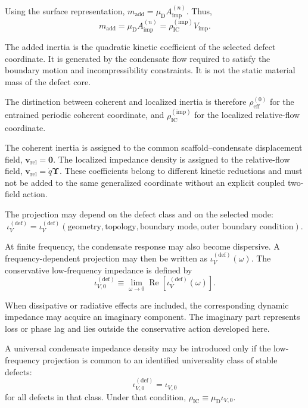 Using the surface representation, $m_{\mathrm{add}} = \mu_{\mathrm{D}} A_{\mathrm{imp}}^{(n)}$. Thus,
\begin{equation}
    m_{\mathrm{add}} = \mu_{\mathrm{D}} A_{\mathrm{imp}}^{(n)} = \rho_{\mathrm{IC}}^{(\mathrm{imp})} V_{\mathrm{imp}}.
\end{equation}

The added inertia is the quadratic kinetic coefficient of the selected defect coordinate. It is generated by the condensate flow required to satisfy the boundary motion and incompressibility constraints. It is not the static material mass of the defect core.

The distinction between coherent and localized inertia is therefore $\rho_{\mathrm{eff}}^{(0)}$ for the entrained periodic coherent coordinate, and $\rho_{\mathrm{IC}}^{(\mathrm{imp})}$ for the localized relative-flow coordinate.

The coherent inertia is assigned to the common scaffold--condensate displacement field, $\mathbf{v}_{\mathrm{rel}}=\mathbf{0}$. The localized impedance density is assigned to the relative-flow field, $\mathbf{v}_{\mathrm{rel}} = \dot{q}\boldsymbol{\Upsilon}$. These coefficients belong to different kinetic reductions and must not be added to the same generalized coordinate without an explicit coupled two-field action.

The projection may depend on the defect class and on the selected mode:
\begin{equation}
    \iota_V^{(\mathrm{def})} = \iota_V^{(\mathrm{def})} \left( \text{geometry}, \text{topology}, \text{boundary mode}, \text{outer boundary condition} \right).
\end{equation}

At finite frequency, the condensate response may also become dispersive. A frequency-dependent projection may then be written as $\iota_V^{(\mathrm{def})}(\omega)$. The conservative low-frequency impedance is defined by
\begin{equation}
    \iota_{V,0}^{(\mathrm{def})} \equiv \lim_{\omega\rightarrow0} \operatorname{Re} \left[ \iota_V^{(\mathrm{def})}(\omega) \right].
\end{equation}

When dissipative or radiative effects are included, the corresponding dynamic impedance may acquire an imaginary component. The imaginary part represents loss or phase lag and lies outside the conservative action developed here.

A universal condensate impedance density may be introduced only if the low-frequency projection is common to an identified universality class of stable defects:
\begin{equation}
    \iota_{V,0}^{(\mathrm{def})} = \iota_{V,0}
\end{equation}
for all defects in that class. Under that condition, $\rho_{\mathrm{IC}} \equiv \mu_{\mathrm{D}}\iota_{V,0}$.

